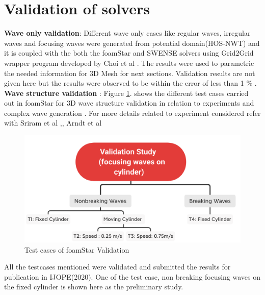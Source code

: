 \documentclass[preprint,12pt]{article}
\begin{document}
{\section{Validation of solvers}
\textbf{Wave only validation}: Different wave only cases like regular waves, irregular waves and focusing waves were generated from potential domain(HOS-NWT) and it is coupled with the both the foamStar and SWENSE solvers using Grid2Grid wrapper program developed by Choi et al \cite{Choi2017}. The results were used to parametric the needed information for 3D Mesh for next sections. Validation results are not given here but the results were observed to be within the error of less than 1 \% . \\
\textbf{Wave structure validation} : Figure \ref{foamStar_validation}.  shows the different test cases carried out in foamStar for 3D wave structure validation in relation to experiments and complex wave generation . For more details related to experiment considered refer with Sriram et al \cite{SRIRAM2015279},\cite{sriramexpt}, Arndt et al \cite{hilderbrandtexpt}
\begin{figure}
 \centering 
 \includegraphics[width=\textwidth]{foamStar_testcase.png}
 \caption{Test cases of foamStar Validation}
 \label{foamStar_validation}
\end{figure}

All the testcases mentioned were  validated and submitted the results for publication in IJOPE(2020). One of the test case, non breaking focusing waves on the fixed cylinder is shown here as the preliminary study. 

}
\end{document}
